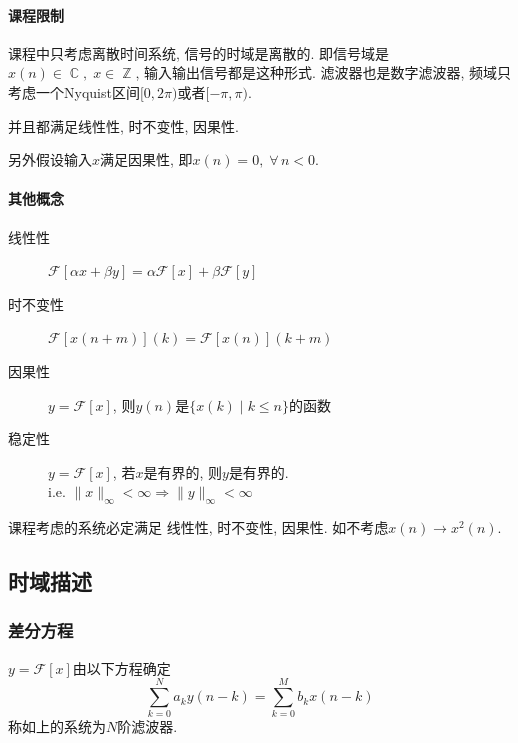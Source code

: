 \documentclass{ctexart}
\DeclareMathOperator{\Cset}{\mathbb{C}}
\DeclareMathOperator{\Zset}{\mathbb{Z}}
\begin{document}
\paragraph{课程限制}
    课程中只考虑离散时间系统, 信号的时域是离散的.
    即信号域是$x(n) \in \Cset,\; x\in \Zset$, 输入输出信号都是这种形式.
    滤波器也是数字滤波器, 频域只考虑一个Nyquist区间$[0, 2\pi)$或者$[-\pi, \pi)$.\par
    并且都满足线性性, 时不变性, 因果性.\par
    另外假设输入$x$满足因果性, 即$x(n) = 0, \;\forall\, n < 0$.
\paragraph{其他概念}
    \begin{description}
        \item[线性性] $\mathcal{F}[\alpha x + \beta y] = \alpha \mathcal{F}[x] + \beta \mathcal{F}[y]$
        \item[时不变性] $\mathcal{F}[x(n + m)](k) = \mathcal{F}[x(n)](k + m)$
        \item[因果性] $y = \mathcal{F}[x]$, 则$y(n)$是$\{ x(k) \;|\; k \le n \}$的函数
        \item[稳定性] $y = \mathcal{F}[x]$, 若$x$是有界的, 则$y$是有界的.\\
                i.e. $\|x\|_{\infty} < \infty \Rightarrow \|y\|_{\infty} < \infty$
    \end{description}
    课程考虑的系统必定满足 线性性, 时不变性, 因果性. 如不考虑$x(n) \to x^2(n)$.

\subsection{时域描述}
\subsubsection{差分方程}
    $y = \mathcal{F}[x]$由以下方程确定 \[
        \sum_{k = 0}^N a_k y(n - k)  = \sum_{k = 0}^M b_k x(n - k)\]
    称如上的系统为$N$阶滤波器.
\end{document}
